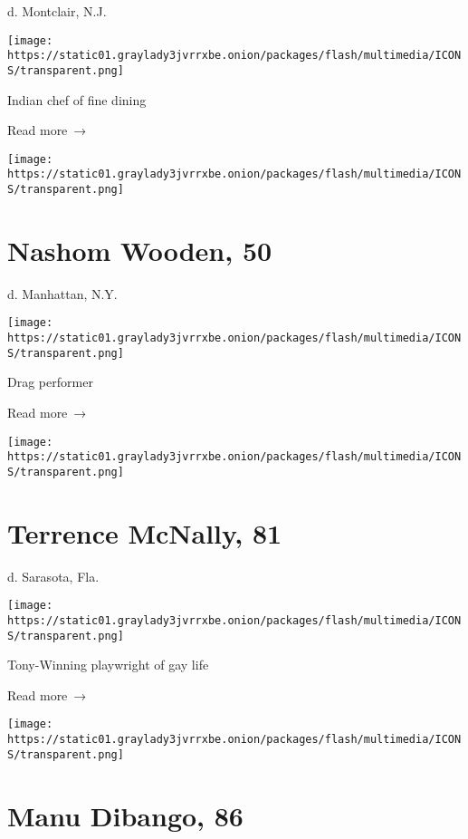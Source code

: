 d. Montclair, N.J.

\texttt{[image: https://static01.graylady3jvrrxbe.onion/packages/flash/multimedia/ICONS/transparent.png]}

Indian chef of fine dining

 Read more~→

\href{https://www.nytimes3xbfgragh.onion/2020/03/24/style/nashom-wooden-mona-foot-death-coronavirus.html}{}

\texttt{[image: https://static01.graylady3jvrrxbe.onion/packages/flash/multimedia/ICONS/transparent.png]}

\hypertarget{nashom-wooden-50}{%
\section{Nashom Wooden, 50}\label{nashom-wooden-50}}

d. Manhattan, N.Y.

\texttt{[image: https://static01.graylady3jvrrxbe.onion/packages/flash/multimedia/ICONS/transparent.png]}

Drag performer

 Read more~→

\href{https://www.nytimes3xbfgragh.onion/2020/03/24/theater/terrence-mcnally-dead-coronavirus.html}{}

\texttt{[image: https://static01.graylady3jvrrxbe.onion/packages/flash/multimedia/ICONS/transparent.png]}

\hypertarget{terrence-mcnally-81}{%
\section{Terrence McNally, 81}\label{terrence-mcnally-81}}

d. Sarasota, Fla.

\texttt{[image: https://static01.graylady3jvrrxbe.onion/packages/flash/multimedia/ICONS/transparent.png]}

Tony-Winning playwright of gay life

 Read more~→

\href{https://www.nytimes3xbfgragh.onion/2020/03/24/arts/music/manu-dibango-dead-coronavirus.html}{}

\texttt{[image: https://static01.graylady3jvrrxbe.onion/packages/flash/multimedia/ICONS/transparent.png]}

\hypertarget{manu-dibango-86}{%
\section{Manu Dibango, 86}\label{manu-dibango-86}}


